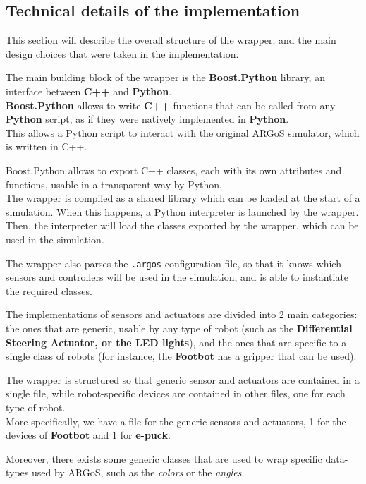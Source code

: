 \documentclass[
12pt,
a4paper,
oneside,
headinclude,
footinclude]{article}
\theoremstyle{definition} %
\begin{document}
\subsection{Technical details of the implementation}

This section will describe the overall structure of the wrapper, and the main design choices that were taken in the implementation. 

The main building block of the wrapper is the \textbf{Boost.Python} library, an interface between \textbf{C++} and \textbf{Python}. \\
\textbf{Boost.Python} allows to write \textbf{C++} functions that can be called from any \textbf{Python} script, as if they were natively implemented in \textbf{Python}. \\
This allows a Python script to interact with the original ARGoS simulator, which is written in C++.

Boost.Python allows to export C++ classes, each with its own attributes and functions, usable in a transparent way by Python.\\
The wrapper is compiled as a shared library which can be loaded at the start of a simulation. When this happens, a Python interpreter is launched by the wrapper.\\
Then, the interpreter will load the classes exported by the wrapper, which can be used in the simulation.

The wrapper also parses the \texttt{.argos} configuration file, so that it knows which sensors and controllers will be used in the simulation, and is able to instantiate the required classes.

The implementations of sensors and actuators are divided into 2 main categories: the ones that are generic, usable by any type of robot (such as the \textbf{Differential Steering Actuator, or the LED lights}), and the ones that are specific to a single class of robots (for instance, the \textbf{Footbot} has a gripper that can be used).

The wrapper is structured so that generic sensor and actuators are contained in a single file, while robot-specific devices are contained in other files, one for each type of robot.\\
More specifically, we have a file for the generic sensors and actuators, 1 for the devices of \textbf{Footbot} and 1 for \textbf{e-puck}.

Moreover, there exists some generic classes that are used to wrap specific data-types used by ARGoS, such as the \textit{colors} or the \textit{angles}. 
\end{document}
